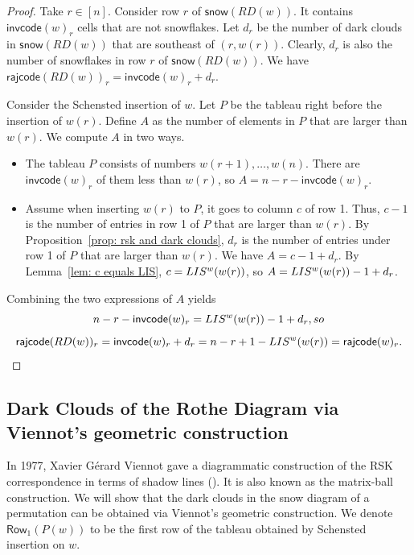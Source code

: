 \documentclass[10pt]{amsart}
\theoremstyle{plain}
\theoremstyle{plain}
\theoremstyle{definition}
\theoremstyle{definition}
\theoremstyle{definition}
\theoremstyle{plain}
\theoremstyle{plain}
\theoremstyle{plain}
\theoremstyle{plain}
\theoremstyle{plain}
\theoremstyle{remark}
\theoremstyle{remark}
\theoremstyle{plain}
\theoremstyle{plain}
\newcommand{\snow}{\mathsf{snow}}
\newcommand{\rajcode}{\mathsf{rajcode}}
\newcommand{\invcode}{\mathsf{invcode}}
\newcommand{\Rowone}[1]
{{\mathsf{{Row}}}_1(P(#1))}
\begin{document}
\begin{proof}
Take $r \in [n]$.
Consider row $r$ of $\snow(RD(w))$.
It contains $\invcode(w)_r$ cells that are not snowflakes. 
Let $d_r$ be the number of dark clouds in $\snow(RD(w))$ 
that are southeast of $(r,w(r))$.
Clearly, $d_r$ is also the number of snowflakes in row $r$ of $\snow(RD(w))$.
We have $\rajcode(RD(w))_r = \invcode(w)_r + d_r$.

Consider the Schensted insertion of $w$.
Let $P$ be the tableau right before the insertion of $w(r)$.
Define $A$ as the number of elements
in $P$ that are larger than $w(r)$.
We compute $A$ in two ways. 
\begin{itemize}
\item The tableau $P$
consists of numbers 
$w(r+1), \dots, w(n)$.
There are $\invcode(w)_r$ of them 
less than $w(r)$,
so $A = n - r - \invcode(w)_r$.
\item
Assume when inserting $w(r)$ to $P$,
it goes to column $c$ of row 1. 
Thus,  
$c-1$ is the number of entries in row 1
of $P$ that are larger than $w(r)$.
By Proposition~\ref{prop: rsk and dark clouds},
$d_r$ is the number of entries 
under row 1 of $P$
that are larger than $w(r)$.
We have $A = c - 1 + d_r$.
By Lemma~\ref{lem: c equals LIS},
$c = \textup{LIS}^w(w(r))$,
so $A = \textup{LIS}^w(w(r)) - 1 + d_r$.
\end{itemize}

Combining the two expressions of $A$ 
yields
$$
 n - r - \invcode(w)_r = \textup{LIS}^w(w(r)) - 1 + d_r, \textrm{ so}
$$
$$
\rajcode(RD(w))_r = \invcode(w)_r + d_r
= n - r + 1 - \textup{LIS}^w(w(r))
= \rajcode(w)_r.
$$
\end{proof}


\subsection{Dark Clouds of the Rothe Diagram via Viennot's geometric construction}
\label{subsec.shadow.diagram}
In 1977, Xavier G{\'e}rard Viennot gave a diagrammatic construction of the RSK correspondence 
in terms of shadow lines (\cite{viennot}). It is also known as the matrix-ball construction. We will show that the dark clouds in the snow diagram of a permutation can be obtained via Viennot's geometric construction. 
We denote $\Rowone{w}$ to be the first row of the tableau obtained by Schensted insertion on $w$.
\end{document}
